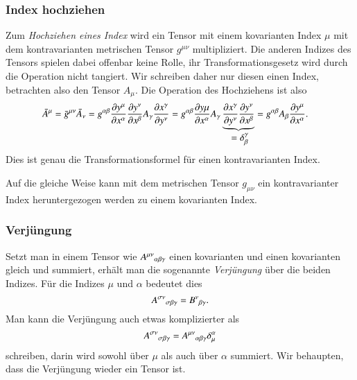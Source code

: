 \subsubsection{Index hochziehen}
Zum {\em Hochziehen eines Index} wird ein Tensor mit einem kovarianten
Index $\mu$ mit dem kontravarianten metrischen Tensor $g^{\mu\nu}$
multipliziert.
%
%
Die anderen Indizes des Tensors spielen dabei offenbar keine Rolle,
ihr Transformationsgesetz wird durch die Operation nicht tangiert.
Wir schreiben daher nur diesen einen Index, betrachten also den Tensor
$A_\mu$.
Die Operation des Hochziehens ist also
\begin{align*}
\bar A^\mu
=
\bar g^{\mu\nu}\bar A_\nu
&=
g^{\alpha\beta}
\frac{\partial y^\mu}{\partial x^\alpha}
\frac{\partial y^\nu}{\partial x^\beta}
A_\gamma
\frac{\partial x^\gamma}{\partial y^\nu}
=
g^{\alpha\beta}
\frac{\partial y\mu}{\partial x^\alpha}
A_\gamma
\underbrace{
\frac{\partial x^\gamma}{\partial y^\nu}
\frac{\partial y^\nu}{\partial x^\beta}
}_{\displaystyle \mathstrut= \delta^\gamma_\beta}
=
g^{\alpha\beta}
A_\beta
\frac{\partial y^\mu}{\partial x^\alpha}.
\end{align*}
Dies ist genau die Transformationsformel für einen kontravarianten Index.

Auf die gleiche Weise kann mit dem metrischen Tensor $g_{\mu\nu}$ ein
kontravarianter Index heruntergezogen werden zu einem kovarianten Index.
%
%

\subsubsection{Verjüngung}
Setzt man in einem Tensor wie $A^{\mu\nu}\mathstrut_{\alpha\beta\gamma}$
einen kovarianten und einen kovarianten gleich und summiert,
erhält man die sogenannte {\em Verjüngung} über die beiden Indizes.
%
Für die Indizes $\mu$ und $\alpha$ bedeutet dies
\[
A^{\sigma\nu}\mathstrut_{\sigma\beta\gamma}
=
B^\nu\mathstrut_{\beta\gamma}.
\]
Man kann die Verjüngung auch etwas komplizierter als
\begin{equation}
A^{\sigma\nu}\mathstrut_{\sigma\beta\gamma}
=
A^{\mu\nu}\mathstrut_{\alpha\beta\gamma}\delta^\alpha_\mu
\label{skript:trafo:verjung}
\end{equation}
schreiben, darin wird sowohl über $\mu$ als auch über $\alpha$
summiert.
Wir behaupten, dass die Verjüngung wieder ein Tensor ist.


